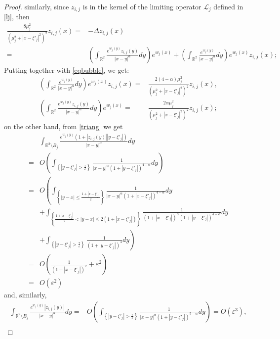 \documentclass[10pt,a4paper]{amsart}
\begin{document}
\begin{proof}
similarly, since $z_{i,j}$ is in the kernel of the limiting operator $\mathcal L_j$ defined in \eqref{lj}, then
\begin{align*}
\frac{8\mu_j^2}{\left(\mu_j^2+\left|x-\xi'_j\right|^2\right)^2}z_{i,j}(x)=&-\Delta z_{i,j}(x)\\
=&\left(\int_{\mathbb R^2}\frac{e^{w_j(y)}z_{i,j}(y)}{|x-y|^\alpha}dy\right)e^{w_j(x)}+\left(\int_{\mathbb R^2}\frac{e^{w_j(y)}}{|x-y|^\alpha}dy\right)e^{w_j(x)}z_{i,j}(x);
\end{align*}
Putting together with \eqref{eqbubble}, we get:
\begin{align*}
\left(\int_{\mathbb R^2}\frac{e^{w_j(y)}}{|x-y|^\alpha}dy\right)e^{w_j(x)}z_{i,j}(x)=&\frac{2(4-\alpha)\mu_j^2}{\left(\mu_j^2+\left|x-\xi'_j\right|^2\right)^2}z_{i,j}(x),\\
\left(\int_{\mathbb R^2}\frac{e^{w_j(y)}z_{i,j}(y)}{|x-y|^\alpha}dy\right)e^{w_j(x)}=&\frac{2\alpha\mu_j^2}{\left(\mu_j^2+\left|x-\xi'_j\right|^2\right)^2}z_{i,j}(x);
\end{align*}
on the other hand, from \eqref{triang} we get
\begin{align*}
&\int_{\mathbb R^2\setminus B_j}\frac{e^{w_j(y)}\left(1+|z_{i,j}(y)|\left|y-\xi'_j\right|\right)}{|x-y|^\alpha}dy\\
=&O\left(\int_{\left\{\left|y-\xi'_j\right|>\frac\tau\varepsilon\right\}}\frac1{|x-y|^\alpha\left(1+\left|y-\xi'_j\right|\right)^{4-\alpha}}dy\right)\\
=&O\left(\int_{\left\{|y-x|\le\frac{1+\left|x-\xi'_j\right|}2\right\}}\frac1{|x-y|^\alpha\left(1+\left|x-\xi'_j\right|\right)^{4-\alpha}}dy\right.\\
&\left.+\int_{\left\{\frac{1+\left|x-\xi'_j\right|}2<|y-x|\le2\left(1+\left|x-\xi'_j\right|\right)\right\}}\frac1{\left(1+\left|x-\xi'_j\right|\right)^\alpha\left(1+\left|y-\xi'_j\right|\right)^{4-\alpha}}dy\right.\\
&\left.+\int_{\left\{\left|y-\xi'_j\right|>\frac\tau\varepsilon\right\}}\frac1{\left(1+\left|y-\xi'_j\right|\right)^4}dy\right)\\
=&O\left(\frac1{\left(1+\left|x-\xi'_j\right|\right)^2}+\varepsilon^2\right)\\
=&O\left(\varepsilon^2\right)
\end{align*}
and, similarly,
\begin{align*}
\int_{\mathbb R^2\setminus B_j}\frac{e^{w_j(y)}|z_{i,j}(y)|}{|x-y|^\alpha}dy=&O\left(\int_{\left\{\left|y-\xi'_j\right|>\frac\tau\varepsilon\right\}}\frac1{|x-y|^\alpha\left(1+\left|y-\xi'_j\right|\right)^{5-\alpha}}dy\right)=O\left(\varepsilon^3\right),\\

\end{align*}
\end{proof}
\end{document}

